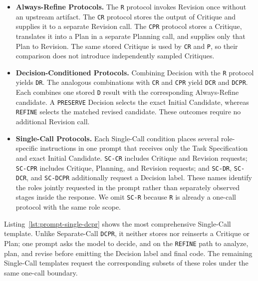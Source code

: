 \begin{itemize}
\item \textbf{Always-Refine Protocols.}
The \texttt{R} protocol invokes Revision once without an upstream artifact.
The \texttt{CR} protocol stores the output of Critique and supplies it to a separate Revision call.
The \texttt{CPR} protocol stores a Critique, translates it into a Plan in a separate Planning call, and supplies only that Plan to Revision.
The same stored Critique is used by \texttt{CR} and \texttt{P}, so their comparison does not introduce independently sampled Critiques.
\item \textbf{Decision-Conditioned Protocols.}
Combining Decision with the \texttt{R} protocol yields \texttt{DR}.
The analogous combinations with \texttt{CR} and \texttt{CPR} yield \texttt{DCR} and \texttt{DCPR}.
Each combines one stored \texttt{D} result with the corresponding Always-Refine candidate.
A \texttt{PRESERVE} Decision selects the exact Initial Candidate, whereas \texttt{REFINE} selects the matched revised candidate.
These outcomes require no additional Revision call.
\item \textbf{Single-Call Protocols.}
Each Single-Call condition places several role-specific instructions in one prompt that receives only the Task Specification and exact Initial Candidate.
\texttt{SC-CR} includes Critique and Revision requests; \texttt{SC-CPR} includes Critique, Planning, and Revision requests; and \texttt{SC-DR}, \texttt{SC-DCR}, and \texttt{SC-DCPR} additionally request a Decision label.
These names identify the roles jointly requested in the prompt rather than separately observed stages inside the response.
We omit \texttt{SC-R} because \texttt{R} is already a one-call protocol with the same role scope.
\end{itemize}

Listing~\ref{lst:prompt-single-dcpr} shows the most comprehensive Single-Call template.
Unlike Separate-Call \texttt{DCPR}, it neither stores nor reinserts a Critique or Plan; one prompt asks the model to decide, and on the \texttt{REFINE} path to analyze, plan, and revise before emitting the Decision label and final code.
The remaining Single-Call templates request the corresponding subsets of these roles under the same one-call boundary.

\noindent\begin{minipage}{\columnwidth}

\end{minipage}

